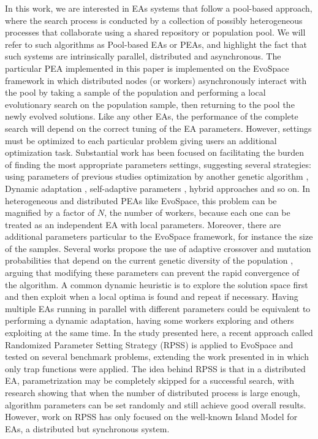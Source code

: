\documentclass{llncs}
\begin{document}
In this work, we are interested in EAs systems that follow a
pool-based approach, where the search process is conducted by a
collection of possibly heterogeneous processes that collaborate using
a shared repository or population pool. We will refer to such
algorithms as Pool-based EAs or PEAs, and highlight the fact that such
systems are intrinsically parallel, distributed and asynchronous.
The particular PEA implemented in this paper is implemented on 
the EvoSpace framework  \cite{GValdez2015}
in which distributed nodes (or workers) asynchronously interact 
with the pool by taking a sample of the population and performing 
a local evolutionary search on the population sample, then returning 
to the pool the newly evolved solutions. 
Like any other EAs, the performance of the complete search will depend
on the correct tuning of the EA parameters. However, settings 
must be optimized to each particular problem \cite{de2007parameter}  
giving users an additional optimization task. 
Substantial work has been focused on facilitating the burden of finding 
the most appropriate parameters settings, suggesting several strategies:
using parameters of previous studies \cite{eiben1999parameter} 
optimization by another genetic algorithm \cite{}, Dynamic adaptation \cite{}, 
self-adaptive parameters \cite{pellerin2004self}, hybrid approaches and so on.
In heterogeneous and distributed PEAs like EvoSpace, this problem can 
be magnified by a factor of $N$, the number of workers, because each one
can be treated as an independent EA with local parameters. Moreover, there
are additional parameters particular to the EvoSpace framework, 
for instance the size of the samples.
Several works propose the use of adaptive crossover and mutation probabilities
that depend on the current genetic diversity of the population \cite{pellerin2004self},
arguing that modifying these parameters can prevent the rapid convergence of the 
algorithm. 
A common dynamic heuristic is to explore the solution space first and then exploit
when a local optima is found and repeat if necessary.  
Having multiple EAs running in parallel with different parameters could be 
equivalent to performing a dynamic adaptation, having some workers exploring
and others exploiting at the same time. 
In the study presented here, a recent approach called Randomized Parameter
Setting Strategy (RPSS) \cite{fuku1,fuku2} is applied to EvoSpace and tested on 
several benchmark problems, extending the work presented in \cite{garcia2014randomized} 
in which only trap functions were applied.
The idea behind RPSS is that in a distributed EA, parametrization may be
completely skipped for a successful search, with research showing that when the 
number of distributed process is large enough, algorithm parameters can be set 
randomly and still achieve good overall results. However, work on RPSS has 
only focused on the well-known Island Model for EAs, a distributed but synchronous system.
\end{document}
